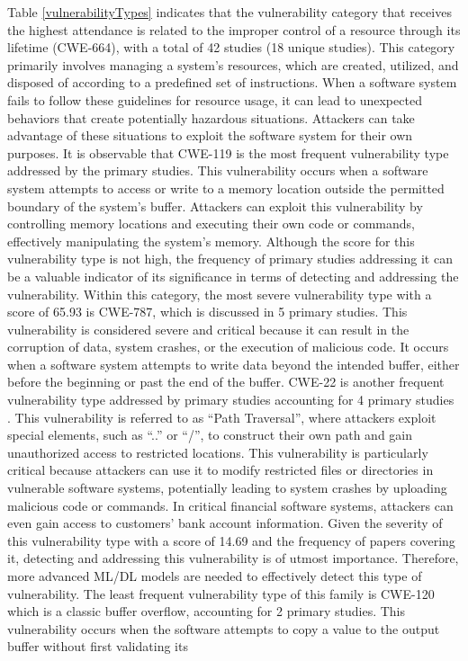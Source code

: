 Table \ref{vulnerabilityTypes} indicates that the vulnerability category that receives the highest attendance is related to the improper control of a resource through its lifetime (CWE-664), with a total of 42 studies (18 unique studies). This category primarily involves managing a system's resources, which are created, utilized, and disposed of according to a predefined set of instructions. When a software system fails to follow these guidelines for resource usage, it can lead to unexpected behaviors that create potentially hazardous situations. Attackers can take advantage of these situations to exploit the software system for their own purposes. It is observable that CWE-119 \cite{russell2018automated, liu2020cd, nguyen2020deep, cheng2021deepwukong, yan2021han, fu2022linevul, le2018maximal, cao2022mvd, chen2021neural, lin2019software, filus2020random, li2018vuldeepecker, duan2019vulsniper, wang2020combining} is the most frequent vulnerability type addressed by the primary studies. This vulnerability occurs when a software system attempts to access or write to a memory location outside the permitted boundary of the system's buffer. Attackers can exploit this vulnerability by controlling memory locations and executing their own code or commands, effectively manipulating the system's memory. Although the score for this vulnerability type is not high, the frequency of primary studies addressing it can be a valuable indicator of its significance in terms of detecting and addressing the vulnerability. Within this category, the most severe vulnerability type with a score of 65.93 is CWE-787, which is discussed in 5 primary studies. This vulnerability is considered severe and critical because it can result in the corruption of data, system crashes, or the execution of malicious code. It occurs when a software system attempts to write data beyond the intended buffer, either before the beginning or past the end of the buffer. CWE-22 is another frequent vulnerability type addressed by primary studies accounting for 4 primary studies \cite{fu2022linevul, ghaffarian2021neural, cheng2021deepwukong, cao2022mvd}. This vulnerability is referred to as ``Path Traversal'', where attackers exploit special elements, such as ``..'' or ``/'', to construct their own path and gain unauthorized access to restricted locations. This vulnerability is particularly critical because attackers can use it to modify restricted files or directories in vulnerable software systems, potentially leading to system crashes by uploading malicious code or commands. In critical financial software systems, attackers can even gain access to customers' bank account information. Given the severity of this vulnerability type with a score of 14.69 and the frequency of papers covering it, detecting and addressing this vulnerability is of utmost importance. Therefore, more advanced ML/DL models are needed to effectively detect this type of vulnerability. The least frequent vulnerability type of this family is CWE-120 \cite{russell2018automated, cao2022mvd} which is a classic buffer overflow, accounting for 2 primary studies. This vulnerability occurs when the software attempts to copy a value to the output buffer without first validating its 